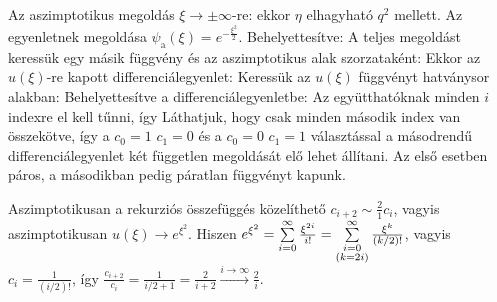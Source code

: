     Az aszimptotikus megoldás $\xi\to\pm\infty$-re: ekkor $\eta$ elhagyható $q^2$ mellett. Az egyenletnek megoldása $\psi_\text{a}(\xi)=e^{-\frac{\xi^2}{2}}$. Behelyettesítve:
    A teljes megoldást keressük egy másik függvény és az aszimptotikus alak szorzataként:
    Ekkor az $u(\xi)$-re kapott differenciálegyenlet:
    Keressük az $u(\xi)$ függvényt hatványsor alakban:
    Behelyettesítve a differenciálegyenletbe:
    Az együtthatóknak minden $i$ indexre el kell tűnni, így
    Láthatjuk, hogy csak minden második index van összekötve, így a $c_0=1$ $c_1=0$ és a $c_0=0$ $c_1=1$ választással a másodrendű differenciálegyenlet két független megoldását elő lehet állítani. Az első esetben páros, a másodikban pedig páratlan függvényt kapunk. 
    
    Aszimptotikusan a rekurziós összefüggés közelíthető $c_{i+2}\sim\frac{2}{1}c_i$, vagyis aszimptotikusan $u(\xi)\to e^{\xi^2}$. Hiszen $e^{\xi^2}=\sum\limits_{i=0}^{\infty}\frac{\xi^{2i}}{i!}=\sum\limits_{\substack{i=0\\ (k=2i)}}^{\infty}\frac{\xi^{k}}{(k/2)!}$, vagyis $c_i=\frac{1}{(i/2)!}$, így $\frac{c_{i+2}}{c_i}=\frac{1}{i/2+1}=\frac{2}{i+2}\xrightarrow{i\to\infty}\frac{2}{i}$.
    
